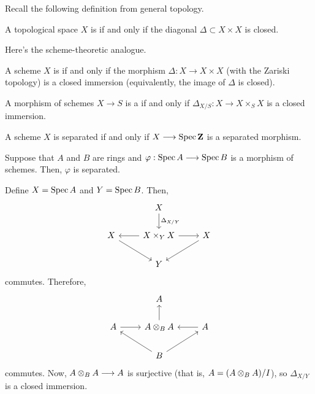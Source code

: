 \documentclass [11 pt, oneside] {article}
\begin{document}

Recall the following definition from general topology.

 \begin{definition}[ ]\label{}\text{}
A topological space $X$ is  if and only if the diagonal $\Delta\subset X\times X$ is closed.
\end{definition}

Here's the scheme-theoretic analogue.

\begin{definition}[ ]\label{}\text{}
A scheme $X$ is  if and only if the morphism $\Delta : X\longrightarrow X\times X$ (with the Zariski topology) is a closed immersion (equivalently, the image of $\Delta$ is closed).
\end{definition}

 \begin{definition}[ ]\label{}\text{}
A morphism of schemes $X\longrightarrow S$ is a  if and only if $\Delta_{X/S} : X\longrightarrow X\times_S X$ is a closed immersion.
\end{definition}

\begin{remark}
	A scheme $X$ is separated if and only if $X\longrightarrow \operatorname{Spec} \mathbf{Z}$ is a separated morphism. 
\end{remark}

\begin{example}[ ]\label{}\text{}
Suppose that $A$ and $B$ are rings and $\varphi: \operatorname{Spec} A\longrightarrow \operatorname{Spec} B$ is a morphism of schemes. Then, $\varphi$ is separated. 

Define $X = \operatorname{Spec} A$ and $Y=\operatorname{Spec} B$. Then, 
\[
\begin{tikzcd}
	&X\ar[d, "\Delta_{X/Y}"] \\
	X\ar[dr] & X\times_Y X \ar[l]\ar[r] & X\ar[dl]\\
		 &Y
\end{tikzcd}
\]
commutes. Therefore,
\[
\begin{tikzcd}
	&A\\
	A\ar[r]&A\tensor_B A\ar[u] &A\ar[l]\\
	       &B \ar[ur]\ar[ul]
\end{tikzcd}
\]
commutes. Now, $A\otimes_B A\longrightarrow  A$ is surjective (that is, $A = (A\otimes_BA)/I$), so $\Delta_{X/Y}$ is a closed immersion.
\end{example}
\end{document}
